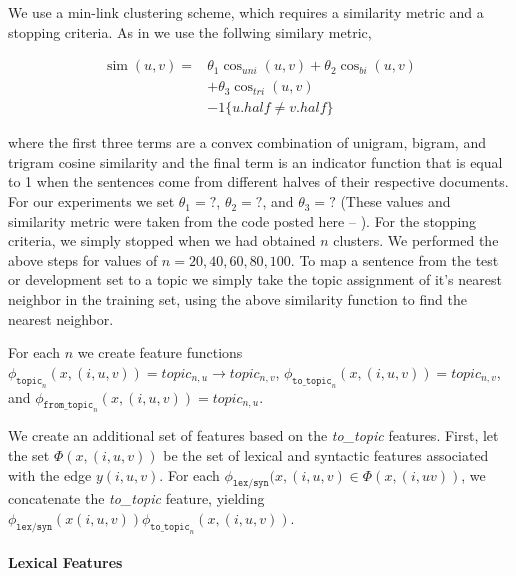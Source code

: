 \documentclass[11pt]{article}
\begin{document}
We use a min-link clustering scheme, which requires a similarity metric and a stopping criteria. As in  we use the follwing similary metric,

\begin{align*} \operatorname{sim}(u,v)  = &  \theta_1 \cos_{uni}(u,v) + \theta_2 \cos_{bi}(u,v) \\ 
& + \theta_3 \cos_{tri}(u,v) \\
&- 1\{u.half \ne v.half \} 
\end{align*}

where the first three terms are a convex combination of unigram, bigram, and trigram cosine similarity and the final term is an indicator function that is equal to 1 when the sentences come from different halves of their respective documents.
For our experiments we set $\theta_1 = ?$, $\theta_2 = ?$, and $\theta_3 = ?$ (These values and similarity metric were taken from the code posted here -- ).
For the  stopping criteria, we simply stopped when we had obtained $n$ clusters. 
We performed the above steps for values of $n = 20,40, 60, 80, 100$.
To map a sentence from the test or development set to a topic we simply take the topic assignment of it's nearest neighbor in the training set, using the above similarity function to find the nearest neighbor.

For each $n$ we create feature functions $\phi_{\texttt{topic}_n}(x, (i,u,v)) = topic_{n, u} \rightarrow topic_{n, v} $, $\phi_{\texttt{to\_topic}_n}(x, (i,u,v)) = topic_{n, v} $, and $\phi_{\texttt{from\_topic}_n}(x, (i,u,v)) = topic_{n, u} $.


We create an additional set of features based on the {\em to\_topic} features. First, let the set $\Phi(x, (i, u, v))$ be the set of lexical and syntactic features associated with the edge $y(i,u,v)$.
For each $\phi_{\texttt{lex/syn}}(x, (i, u, v) \in \Phi(x, (i, u v))$, we concatenate the  {\em to\_topic} feature, yielding $\phi_{\texttt{lex/syn}}(x (i, u, v)) \phi_{\texttt{to\_topic}_n}(x, (i,u,v))$.






\paragraph{Lexical Features}
\end{document}
